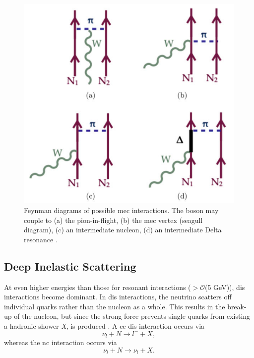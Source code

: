 \begin{figure}[h!]
    \centering
    \includegraphics[width = \largefigwidth]{figures-chap3/mec_diagrams.png}
    \caption[Feynman diagrams of possible \gls{mec} interactions.]{Feynman diagrams of possible \gls{mec} interactions. The boson may couple to (a) the pion-in-flight, (b) the \gls{mec} vertex (seagull diagram), (c) an intermediate nucleon, (d) an intermediate Delta resonance \cite{Measurement_of_the_Antineutrino_Double-Differential_Charged-Current_Quasi-Elastic_Scattering_Cross_Section_at_MINERvA_book}.}
    \label{fig:mec_feynman_diagrams}
\end{figure}

\newpage
\subsection*{Deep Inelastic Scattering}
At even higher energies than those for resonant interactions ($>\mathcal{O}$(5 GeV)), \gls{dis} interactions become dominant. In \gls{dis} interactions, the neutrino scatters off individual quarks rather than the nucleon as a whole. This results in the break-up of the nucleon, but since the strong force prevents single quarks from existing a hadronic shower \textit{X}, is produced \cite{Fundamentals_of_Neutrino_Physics_and_Astrophysics} \cite{Measurement_of_the_Antineutrino_Double-Differential_Charged-Current_Quasi-Elastic_Scattering_Cross_Section_at_MINERvA_book}. A \gls{cc} \gls{dis} interaction occurs via
\begin{equation}
    \nu_l + N \rightarrow l^- + X,
\end{equation}
whereas the \gls{nc} interaction occurs via
\begin{equation}
    \nu_l + N \rightarrow \nu_l + X.
\end{equation}


